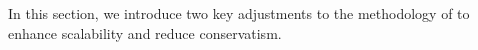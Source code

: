 



In this section, we introduce two key adjustments to the methodology of \cite{hashemi2024statistical} to enhance scalability and reduce conservatism.
